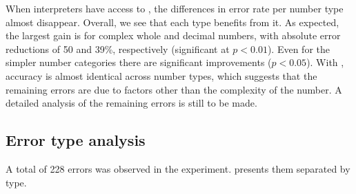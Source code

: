 \documentclass[output=paper]{langsci/langscibook}
\begin{document}
When interpreters have access to , the differences in error rate per number type almost disappear. Overall, we see that each type benefits from it. As expected, the largest gain is for complex whole and decimal numbers, with absolute error reductions of 50 and 39\%, respectively (significant at $p < 0.01$). Even for the simpler number categories there are significant improvements ($p < 0.05$). With , accuracy is almost identical across number types, which suggests that the remaining errors are due to factors other than the complexity of the number. A detailed analysis of the remaining errors is still to be made.   

\subsection{Error type analysis}\largerpage[1]

A total of 228 errors was observed in the experiment.  presents them separated by type.
\end{document}
